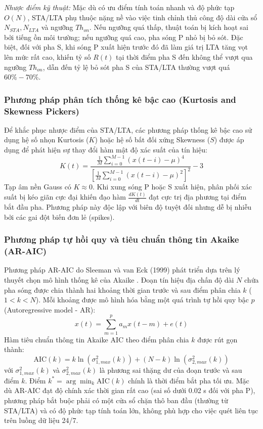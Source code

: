\documentclass[preprint,1p]{elsarticle}
\begin{document}
\textit{Nhược điểm kỹ thuật:} Mặc dù có ưu điểm tính toán nhanh và độ phức tạp $O(N)$, STA/LTA phụ thuộc nặng nề vào việc tinh chỉnh thủ công độ dài cửa sổ $N_{STA}, N_{LTA}$ và ngưỡng $Th_{on}$. Nếu ngưỡng quá thấp, thuật toán bị kích hoạt sai bởi tiếng ồn môi trường; nếu ngưỡng quá cao, pha sóng P nhỏ bị bỏ sót. Đặc biệt, đối với pha S, khi sóng P xuất hiện trước đó đã làm giá trị LTA tăng vọt lên mức rất cao, khiến tỷ số $R(t)$ tại thời điểm pha S đến không thể vượt qua ngưỡng $Th_{on}$, dẫn đến tỷ lệ bỏ sót pha S của STA/LTA thường vượt quá $60\% - 70\%$.

\subsubsection{Phương pháp phân tích thống kê bậc cao (Kurtosis and Skewness Pickers)}
Để khắc phục nhược điểm của STA/LTA, các phương pháp thống kê bậc cao sử dụng hệ số nhọn Kurtosis ($K$) hoặc hệ số bất đối xứng Skewness ($S$) được áp dụng để phát hiện sự thay đổi hàm mật độ xác suất của tín hiệu:
\begin{equation}
K(t) = \frac{\frac{1}{M}\sum_{i=0}^{M-1} (x(t-i) - \mu)^4}{\left[\frac{1}{M}\sum_{i=0}^{M-1} (x(t-i) - \mu)^2\right]^2} - 3
\label{eq:kurtosis}
\end{equation}
Tạp âm nền Gauss có $K \approx 0$. Khi xung sóng P hoặc S xuất hiện, phân phối xác suất bị kéo giãn cực đại khiến đạo hàm $\frac{dK(t)}{dt}$ đạt cực trị địa phương tại điểm bắt đầu pha. Phương pháp này độc lập với biên độ tuyệt đối nhưng dễ bị nhiễu bởi các gai đột biến đơn lẻ (spikes).

\subsubsection{Phương pháp tự hồi quy và tiêu chuẩn thông tin Akaike (AR-AIC)}
Phương pháp AR-AIC do Sleeman và van Eck (1999) \cite{sleeman1999robust} phát triển dựa trên lý thuyết chọn mô hình thống kê của Akaike \cite{akaike1974new}. Đoạn tín hiệu địa chấn độ dài $N$ chứa pha sóng được chia thành hai khoảng thời gian trước và sau điểm phân chia $k$ ($1 < k < N$). Mỗi khoảng được mô hình hóa bằng một quá trình tự hồi quy bậc $p$ (Autoregressive model - AR):
\begin{equation}
x(t) = \sum_{m=1}^{p} a_m x(t - m) + e(t)
\label{eq:ar_model}
\end{equation}
Hàm tiêu chuẩn thông tin Akaike AIC theo điểm phân chia $k$ được rút gọn thành:
\begin{equation}
\text{AIC}(k) = k \ln\left(\sigma_{1,max}^2(k)\right) + (N - k) \ln\left(\sigma_{2,max}^2(k)\right)
\label{eq:aic_formula}
\end{equation}
với $\sigma_{1,max}^2(k)$ và $\sigma_{2,max}^2(k)$ là phương sai thặng dư của đoạn trước và sau điểm $k$. Điểm $k^* = \arg\min_k \text{AIC}(k)$ chính là thời điểm bắt pha tối ưu. Mặc dù AR-AIC đạt độ chính xác thời gian rất cao (sai số dưới 0.02 s đối với pha P), phương pháp bắt buộc phải có một cửa sổ chặn thô ban đầu (thường từ STA/LTA) và có độ phức tạp tính toán lớn, không phù hợp cho việc quét liên tục trên luồng dữ liệu 24/7.
\end{document}
